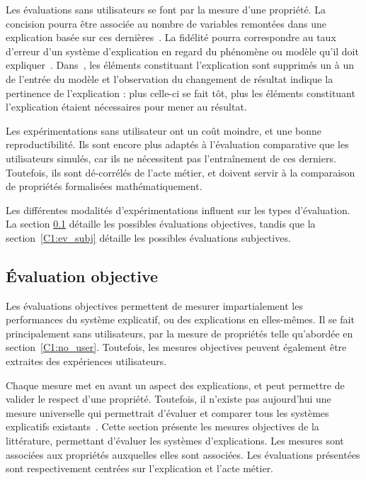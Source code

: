 Les évaluations sans utilisateurs se font par la mesure d'une propriété. La concision pourra être associée au nombre de variables remontées dans une explication basée sur ces dernières~\cite{Zafar2021a}. La fidélité pourra correspondre au taux d'erreur d'un système d'explication en regard du phénomène ou modèle qu'il doit expliquer~\cite{Lakkaraju2019}. Dans~\cite{Petsiuk2018}, les éléments constituant l'explication sont supprimés un à un de l'entrée du modèle et l'observation du changement de résultat indique la pertinence de l'explication : plus celle-ci se fait tôt, plus les éléments constituant l'explication étaient nécessaires pour mener au résultat.

Les expérimentations sans utilisateur ont un coût moindre, et une bonne reproductibilité. Ils sont encore plus adaptés à l'évaluation comparative que les utilisateurs simulés, car ils ne nécessitent pas l'entraînement de ces derniers.
Toutefois, ils sont dé-corrélés de l'acte métier, et doivent servir à la comparaison de propriétés formalisées mathématiquement.


Les différentes modalités d'expérimentations influent sur les types d'évaluation. La section \ref{C1:ev_obj} détaille les possibles évaluations objectives, tandis que la section~\ref{C1:ev_subj} détaille les possibles évaluations subjectives.

\subsection{\'Evaluation objective} \label{C1:ev_obj}
Les évaluations objectives permettent de mesurer impartialement les performances du système explicatif, ou des explications en elles-mêmes. Il se fait principalement sans utilisateurs, par la mesure de propriétés telle qu'abordée en section~\ref{C1:no_user}. Toutefois, les mesures objectives peuvent également être extraites des expériences utilisateurs.

Chaque mesure met en avant un aspect des explications, et peut permettre de valider le respect d'une propriété. Toutefois, il n'existe pas aujourd'hui une mesure universelle qui permettrait d'évaluer et comparer tous les systèmes explicatifs existants~\cite{DoshiVelez2017}.
Cette section présente les mesures objectives de la littérature, permettant d'évaluer les systèmes d'explications. Les mesures sont associées aux propriétés auxquelles elles sont associées.
Les évaluations présentées sont respectivement centrées sur l'explication et l'acte métier.

